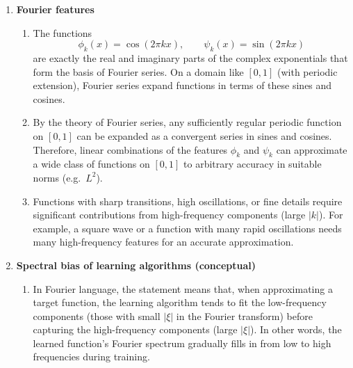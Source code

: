 \documentclass[11pt]{article}
\begin{document}
\begin{enumerate}
\begin{enumerate}
\item This is a first-order linear ODE in $t$:
\[
\partial_t \hat u(t,\xi) + 4\pi^2\xi^2\hat u(t,\xi)=0.
\]
Its solution is
\[
\hat u(t,\xi) = e^{-4\pi^2\xi^2 t}\hat f(\xi).
\]

\item Taking the inverse Fourier transform,
\[
u(t,x)
= \int_{\mathbb{R}} e^{-4\pi^2\xi^2 t}\hat f(\xi)e^{2\pi i x\xi}\,d\xi.
\]
Equivalently, one may write
\[
u(t,x) = (G_t * f)(x),
\]
where $G_t(x)$ is the heat kernel
\[
G_t(x)=\frac{1}{\sqrt{4\pi t}}e^{-x^2/(4t)}.
\]
\end{enumerate}

\bigskip
\item \textbf{Fourier features}

\begin{enumerate}
\item The functions
\[
\phi_k(x)=\cos(2\pi kx),\qquad \psi_k(x)=\sin(2\pi kx)
\]
are exactly the real and imaginary parts of the complex exponentials that form the basis of Fourier series. On a domain like $[0,1]$ (with periodic extension), Fourier series expand functions in terms of these sines and cosines.

\item By the theory of Fourier series, any sufficiently regular periodic function on $[0,1]$ can be expanded as a convergent series in sines and cosines. Therefore, linear combinations of the features $\phi_k$ and $\psi_k$ can approximate a wide class of functions on $[0,1]$ to arbitrary accuracy in suitable norms (e.g.\ $L^2$).

\item Functions with sharp transitions, high oscillations, or fine details require significant contributions from high-frequency components (large $|k|$). For example, a square wave or a function with many rapid oscillations needs many high-frequency features for an accurate approximation.
\end{enumerate}

\bigskip
\item \textbf{Spectral bias of learning algorithms (conceptual)}

\begin{enumerate}
\item In Fourier language, the statement means that, when approximating a target function, the learning algorithm tends to fit the low-frequency components (those with small $|\xi|$ in the Fourier transform) before capturing the high-frequency components (large $|\xi|$). In other words, the learned function's Fourier spectrum gradually fills in from low to high frequencies during training.


\end{enumerate}
\end{enumerate}
\end{document}
